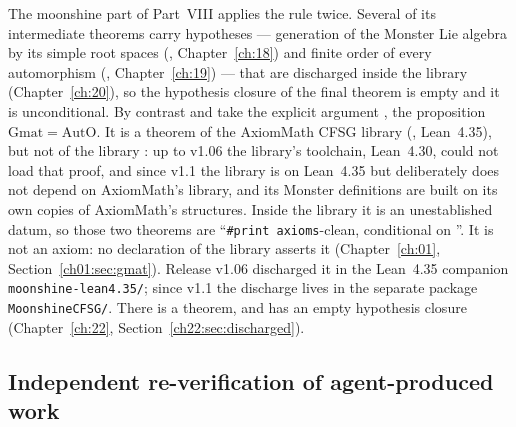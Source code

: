 The moonshine part of Part~VIII applies the rule twice. Several of its intermediate theorems carry hypotheses ---
generation of the Monster Lie algebra by its simple root spaces (, Chapter~\ref{ch:18}) and finite order of
every automorphism (, Chapter~\ref{ch:19}) --- that are discharged inside the library (Chapter~\ref{ch:20}),
so the hypothesis closure of the final theorem  is empty and it is
unconditional. By contrast  and  take the explicit argument
, the proposition $\mathrm{Gmat}=\mathrm{AutO}$. It is a theorem of the AxiomMath CFSG library
(, Lean~4.35), but not of the library :
up to v1.06 the library's toolchain, Lean~4.30, could not load that proof, and since v1.1 the library is on Lean~4.35
but deliberately does not depend on AxiomMath's library, and its Monster definitions are built on its own copies of
AxiomMath's structures. Inside the library it is an unestablished datum, so those two theorems are
``\texttt{\#print axioms}-clean, conditional on ''. It is not an axiom: no declaration of the library
asserts it (Chapter~\ref{ch:01}, Section~\ref{ch01:sec:gmat}). Release v1.06 discharged it in the Lean~4.35 companion
\texttt{moonshine-lean4.35/}; since v1.1 the discharge lives in the separate package \texttt{MoonshineCFSG/}. There
 is a theorem, and  has an empty hypothesis
closure (Chapter~\ref{ch:22}, Section~\ref{ch22:sec:discharged}).

\subsection{Independent re-verification of agent-produced work}\label{ch15:sec:agents}

